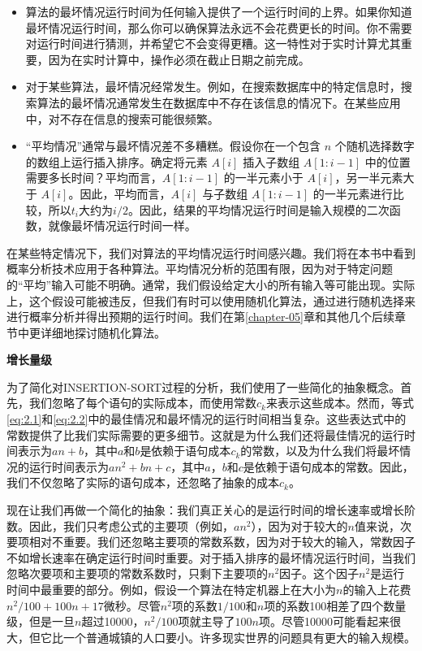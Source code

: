\documentclass[lang=cn,newtx,10pt,scheme=chinese]{elegantbook}
\begin{document}
\begin{itemize}
    \item 算法的最坏情况运行时间为任何输入提供了一个运行时间的上界。如果你知道最坏情况运行时间，那么你可以确保算法永远不会花费更长的时间。你不需要对运行时间进行猜测，并希望它不会变得更糟。这一特性对于实时计算尤其重要，因为在实时计算中，操作必须在截止日期之前完成。
    \item 对于某些算法，最坏情况经常发生。例如，在搜索数据库中的特定信息时，搜索算法的最坏情况通常发生在数据库中不存在该信息的情况下。在某些应用中，对不存在信息的搜索可能很频繁。
    \item ``平均情况''通常与最坏情况差不多糟糕。假设你在一个包含 $n$ 个随机选择数字的数组上运行插入排序。确定将元素 $A[i]$ 插入子数组 $A[1:i-1]$ 中的位置需要多长时间？平均而言，$A[1:i-1]$ 的一半元素小于 $A[i]$，另一半元素大于 $A[i]$。因此，平均而言，$A[i]$ 与子数组 $A[1:i-1]$ 的一半元素进行比较，所以$t_i$大约为$i/2$。因此，结果的平均情况运行时间是输入规模的二次函数，就像最坏情况运行时间一样。
\end{itemize}

在某些特定情况下，我们对算法的平均情况运行时间感兴趣。我们将在本书中看到概率分析技术应用于各种算法。平均情况分析的范围有限，因为对于特定问题的``平均''输入可能不明确。通常，我们假设给定大小的所有输入等可能出现。实际上，这个假设可能被违反，但我们有时可以使用随机化算法，通过进行随机选择来进行概率分析并得出预期的运行时间。我们在第\ref{chapter-05}章和其他几个后续章节中更详细地探讨随机化算法。

\textbf{增长量级}

为了简化对INSERTION-SORT过程的分析，我们使用了一些简化的抽象概念。首先，我们忽略了每个语句的实际成本，而使用常数$c_k$来表示这些成本。然而，等式\eqref{eq:2.1}和\eqref{eq:2.2}中的最佳情况和最坏情况的运行时间相当复杂。这些表达式中的常数提供了比我们实际需要的更多细节。这就是为什么我们还将最佳情况的运行时间表示为$an+b$，其中$a$和$b$是依赖于语句成本$c_k$的常数，以及为什么我们将最坏情况的运行时间表示为$an^2+bn+c$，其中$a$，$b$和$c$是依赖于语句成本的常数。因此，我们不仅忽略了实际的语句成本，还忽略了抽象的成本$c_k$。

现在让我们再做一个简化的抽象：我们真正关心的是运行时间的增长速率或增长阶数。因此，我们只考虑公式的主要项（例如，$an^2$），因为对于较大的$n$值来说，次要项相对不重要。我们还忽略主要项的常数系数，因为对于较大的输入，常数因子不如增长速率在确定运行时间时重要。对于插入排序的最坏情况运行时间，当我们忽略次要项和主要项的常数系数时，只剩下主要项的$n^2$因子。这个因子$n^2$是运行时间中最重要的部分。例如，假设一个算法在特定机器上在大小为$n$的输入上花费$n^2/100 + 100n + 17$微秒。尽管$n^2$项的系数$1/100$和$n$项的系数100相差了四个数量级，但是一旦$n$超过10000，$n^2/100$项就主导了$100n$项。尽管10000可能看起来很大，但它比一个普通城镇的人口要小。许多现实世界的问题具有更大的输入规模。
\end{document}
